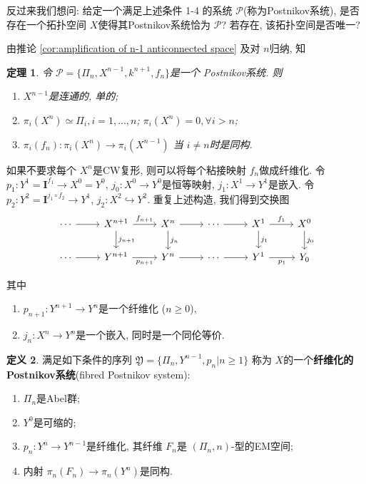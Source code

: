 \documentclass{ctexart}
\theoremstyle{plain}
\newtheorem{theorem}{定理}[section]
\theoremstyle{definition}
\newtheorem{definition}[theorem]{定义}
\renewcommand{\emph}{\textbf}
\begin{document}
        反过来我们想问: 给定一个满足上述条件 1-4 的系统 $\mathscr{P}$(称为Postnikov系统), 是否存在一个拓扑空间 $X$使得其Postnikov系统恰为 $\mathscr{P}$? 若存在, 该拓扑空间是否唯一?

        由推论 \ref{cor:amplification of n-1 anticonnected space} 及对 $n$归纳, 知 
        \begin{theorem}
            令 $\mathscr{P}=\{\Pi_{n}, X^{n-1}, k^{n+1},f_{n}\}$是一个 Postnikov系统. 则 
            \begin{enumerate}
                \item $X^{n-1}$是连通的, 单的;
                \item $\pi_{i}(X^{n})\simeq \Pi_{i},i=1, \ldots ,n$; $\pi_{i}(X^{n})=0, \forall i>n$;
                \item $\pi_{i}(f_{n}):\pi_{i}(X^{n})\to \pi_{i}(X^{n-1})$ 当 $i\neq n$时是同构.
            \end{enumerate}
        \end{theorem}

        如果不要求每个 $X^{n}$是CW复形, 则可以将每个粘接映射 $f_{n}$做成纤维化. 令 $p_1:Y^{1}=\mathbf{I}^{f_1}\to X^{0}=Y^{0}$, $j_0:X^{0}\to Y^{0}$是恒等映射, $j_1:X^{1}\to Y^{1}$是嵌入. 令 $p_2:Y^{2}=\mathbf{I}^{j_1\circ f_2}\to Y^{1}$, $j_2:X^{2}\hookrightarrow Y^{2}$. 重复上述构造, 我们得到交换图 
        \begin{equation}
            \label{eq:commutative diagram of fibred Postnikov system}
          \begin{tikzcd}
            \cdots \arrow[r] & X^{n+1} \arrow[d, "j_{n+1}"] \arrow[r, "f_{n+1}"] & X^{n} \arrow[d, "j_{n}"] \arrow[r] & \cdots \arrow[r] & X^{1}\arrow[d, "j_1"] \arrow[r, "f_1"] & X^{0} \arrow[d, "j_0"] \\
            \cdots \arrow[r] & Y^{n+1} \arrow[r, "p_{n+1}"'] & Y^{n} \arrow[r] & \cdots \arrow[r] & Y^{1} \arrow[r, "p_1"'] & Y_0
          \end{tikzcd}
        \end{equation}

        其中
        \begin{enumerate}
            \item $p_{n+1}:Y^{n+1}\to Y^{n}$是一个纤维化 ($n\ge 0$),
            \item $j_{n}:X^{n}\to Y^{n}$是一个嵌入, 同时是一个同伦等价.
        \end{enumerate}

        \begin{definition}
            满足如下条件的序列 $\mathfrak{Y}=\{\Pi_{n}, Y^{n-1}, p_{n}|n\geq1\}$ 称为 $X$的一个\emph{纤维化的Postnikov系统}(fibred Postnikov system):
            \begin{enumerate}
                \item $\Pi_{n}$是Abel群;
                \item $Y^{0}$是可缩的;
                \item $p_{n}:Y^{n}\to Y^{n-1}$是纤维化, 其纤维 $F_{n}$是 $(\Pi_{n},n)$-型的EM空间;
                \item 内射 $\pi_{n}(F_{n})\to \pi_{n}(Y^{n})$是同构.
            \end{enumerate}
        \end{definition}
\end{document}
